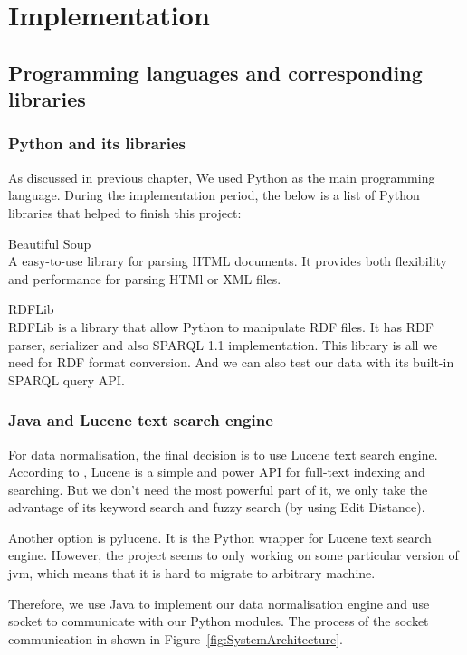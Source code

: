 \chapter{Implementation}

\section{Programming languages and corresponding libraries}

\subsection{Python and its libraries}
As discussed in previous chapter, We used Python as the main programming language. During the implementation period, the below is a list of Python libraries that helped to finish this project:
\begin{description}
	\item Beautiful Soup \hfill \\
	A easy-to-use library for parsing HTML documents. It provides both flexibility and performance for parsing HTMl or XML files.
	\item RDFLib \hfill \\
	RDFLib is a library that allow Python to manipulate RDF files. It has RDF parser, serializer and also SPARQL 1.1 implementation. This library is all we need for RDF format conversion. And we can also test our data with its built-in SPARQL query API.
\end{description}

\subsection{Java and Lucene text search engine}
For data normalisation, the final decision is to use Lucene text search engine. According to \cite{McCandless2010LAS}, Lucene is a simple and power API for full-text indexing and searching. But we don't need the most powerful part of it, we only take the advantage of its keyword search and fuzzy search (by using Edit Distance\cite{Cormen2001IA}).

Another option is pylucene. It is the Python wrapper for Lucene text search engine. However, the project seems to only working on some particular version of \gls{jvm}, which means that it is hard to migrate to arbitrary machine.

Therefore, we use Java to implement our data normalisation engine and use socket to communicate with our Python modules. The process of the socket communication in shown in Figure~\ref{fig:SystemArchitecture}.

